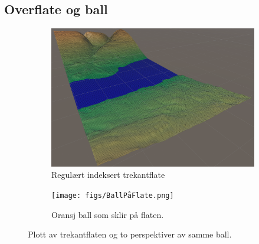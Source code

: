 \documentclass[norsk, doc, 11pt, a4paper]{apa7}  %
\begin{document}
\subsection{Overflate og ball}
\begin{figure}[H]
	\centering
	\begin{subfigure}{.5\textwidth}
		\centering
		\includegraphics[width=.9\linewidth]{figs/surfaceGrid.png}
		\caption{Regulært indeksert trekantflate}
	\end{subfigure}%
	\begin{subfigure}{.5\textwidth}
		\centering
		\texttt{[image: figs/BallPåFlate.png]}
		\caption{Oransj ball som sklir på flaten.}
	\end{subfigure}
	\caption{Plott av trekantflaten og to perspektiver av samme ball.}
\end{figure}
\end{document}
